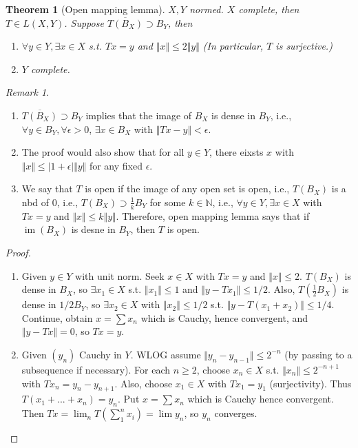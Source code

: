 \documentclass{article}
\theoremstyle{definition}
\theoremstyle{remark}
\newtheorem{rem}{Remark}
\theoremstyle{plain}
\newtheorem{thm}[defn]{Theorem}
\newcommand{\NN}{\mathbb{N}}
\begin{document}
\begin{thm}[Open mapping lemma]
    $X,Y$ normed. $X$ complete, then $T\in L(X,Y)$. Suppose $\overline{T(B_X)}\supset B_Y$, then
    \begin{enumerate}
        \item $\forall y\in Y,\exists x\in X$ s.t. $Tx=y$ and $\Vert x\Vert\le 2\Vert y\Vert$ (In particular, $T$ is surjective.)
        \item $Y$ complete.
    \end{enumerate}
\end{thm}
\begin{rem}
    \begin{enumerate}
        \item $\overline{T(B_X)}\supset B_Y$ implies that the image of $B_X$ is dense in $B_Y$, i.e., $\forall y\in B_Y,\forall\epsilon>0$, $\exists x\in B_X$ with $\Vert Tx-y\Vert<\epsilon$.
        \item The proof would also show that for all $y\in Y$, there eixsts $x$ with $\Vert x\Vert\le|1+\epsilon|\Vert y\Vert$ for any fixed $\epsilon$.
        \item We say that $T$ is open if the image of any open set is open, i.e., $T(B_X)$ is a nbd of $0$, i.e., $T(B_X)\supset\frac{1}{k}B_Y$ for some $k\in\NN$, i.e., $\forall y\in Y,\exists x\in X$ with $Tx=y$ and $\Vert x\Vert\le k\Vert y\Vert$. Therefore, open mapping lemma says that if $\operatorname{im}(B_X)$ is desne in $B_Y$, then $T$ is open.
    \end{enumerate}
\end{rem}
\begin{proof}
    \begin{enumerate}
        \item Given $y\in Y$ with unit norm. Seek $x\in X$ with $Tx=y$ and $\Vert x\Vert\le 2$. $T(B_X)$ is dense in $B_X$, so $\exists x_1\in X$ s.t. $\Vert x_1\Vert\le1$ and $\Vert y-Tx_1\Vert\le 1/2$. Also, $T(\frac{1}{2}B_X)$ is dense in $1/2B_Y$, so $\exists x_2\in X$ with $\Vert x_2\Vert\le 1/2$ s.t. $\Vert y-T(x_1+x_2)\Vert\le 1/4$. Continue, obtain $x=\sum x_n$ which is Cauchy, hence convergent, and $\Vert y-Tx\Vert=0$, so $Tx=y$.
        \item Given $(y_n)$ Cauchy in $Y$. WLOG assume $\Vert y_n-y_{n-1}\Vert\le 2^{-n}$ (by passing to a subsequence if necessary). For each $n\ge 2$, choose $x_n\in X$ s.t. $\Vert x_n\Vert\le 2^{-n+1}$ with $Tx_n=y_n-y_{n+1}$. Also, choose $x_1\in X$ with $Tx_1=y_1$ (surjectivity). Thus $T(x_1+...+x_n)=y_n$. Put $x=\sum x_n$ which is Cauchy hence convergent. Then $Tx=\lim_n T(\sum_1^n x_i)=\lim y_n$, so $y_n$ converges. 
    \end{enumerate}
\end{proof}
\end{document}
